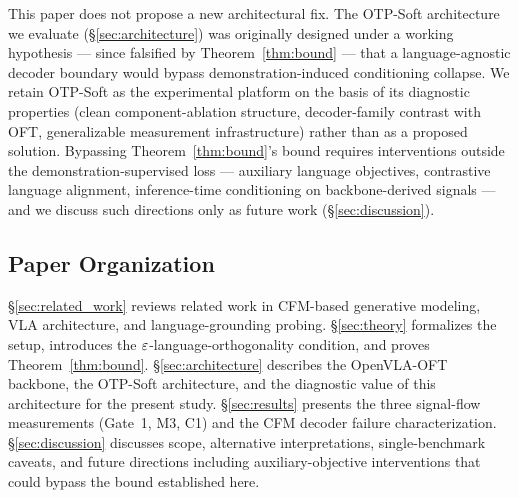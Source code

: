 This paper does not propose a new architectural fix. The OTP-Soft architecture we evaluate
(\S\ref{sec:architecture}) was originally designed under a working hypothesis --- since
falsified by Theorem~\ref{thm:bound} --- that a language-agnostic decoder boundary would
bypass demonstration-induced conditioning collapse. We retain OTP-Soft as the experimental
platform on the basis of its diagnostic properties (clean component-ablation structure,
decoder-family contrast with OFT, generalizable measurement infrastructure) rather than as
a proposed solution. Bypassing Theorem~\ref{thm:bound}'s bound requires interventions
outside the demonstration-supervised loss --- auxiliary language objectives, contrastive
language alignment, inference-time conditioning on backbone-derived signals --- and we
discuss such directions only as future work (\S\ref{sec:discussion}).

\subsection{Paper Organization}
\label{sec:intro:organization}

\S\ref{sec:related_work} reviews related work in CFM-based generative modeling, VLA
architecture, and language-grounding probing. \S\ref{sec:theory} formalizes the setup,
introduces the $\varepsilon$-language-orthogonality condition, and proves
Theorem~\ref{thm:bound}. \S\ref{sec:architecture} describes the OpenVLA-OFT backbone, the
OTP-Soft architecture, and the diagnostic value of this architecture for the present
study. \S\ref{sec:results} presents the three signal-flow measurements (Gate~1, M3, C1)
and the CFM decoder failure characterization. \S\ref{sec:discussion} discusses scope,
alternative interpretations, single-benchmark caveats, and future directions including
auxiliary-objective interventions that could bypass the bound established here.
